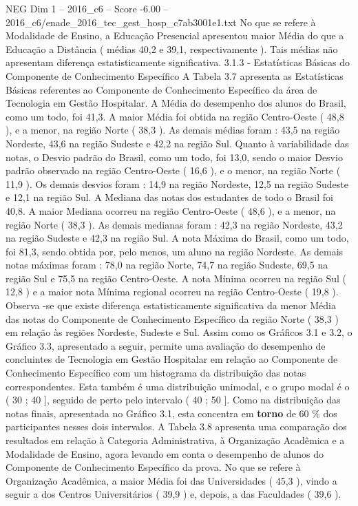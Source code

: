 \begin{textsample}{NEG Dim 1 – 2016\_c6 – Score -6.00 – 2016\_c6/enade\_2016\_tec\_gest\_hosp\_c7ab3001e1.txt}
No que se refere à Modalidade de Ensino, a Educação Presencial apresentou maior Média do que a Educação a Distância ( médias 40,2 e 39,1, respectivamente ).
Tais médias não apresentam diferença estatisticamente significativa. 3.1.3 - Estatísticas Básicas do Componente de Conhecimento Específico A Tabela 3.7 apresenta as Estatísticas Básicas referentes ao Componente de Conhecimento Específico da área de Tecnologia em Gestão Hospitalar.
A Média do desempenho dos alunos do Brasil, como um todo, foi 41,3.
A maior Média foi obtida na região Centro-Oeste ( 48,8 ), e a menor, na região Norte ( 38,3 ).
As demais médias foram : 43,5 na região Nordeste, 43,6 na região Sudeste e 42,2 na região Sul.
Quanto à variabilidade das notas, o Desvio padrão do Brasil, como um todo, foi 13,0, sendo o maior Desvio padrão observado na região Centro-Oeste ( 16,6 ), e o menor, na região Norte ( 11,9 ).
Os demais desvios foram : 14,9 na região Nordeste, 12,5 na região Sudeste e 12,1 na região Sul.
A Mediana das notas dos estudantes de todo o Brasil foi 40,8.
A maior Mediana ocorreu na região Centro-Oeste ( 48,6 ), e a menor, na região Norte ( 38,3 ).
As demais medianas foram : 42,3 na região Nordeste, 43,2 na região Sudeste e 42,3 na região Sul.
A nota Máxima do Brasil, como um todo, foi 81,3, sendo obtida por, pelo menos, um aluno na região Nordeste.
As demais notas máximas foram : 78,0 na região Norte, 74,7 na região Sudeste, 69,5 na região Sul e 75,5 na região Centro-Oeste.
A nota Mínima ocorreu na região Sul ( 12,8 ) e a maior nota Mínima regional ocorreu na região Centro-Oeste ( 19,8 ).
Observa -se que existe diferença estatisticamente significativa da menor Média das notas do Componente de Conhecimento Específico da região Norte ( 38,3 ) em relação às regiões Nordeste, Sudeste e Sul.
Assim como os Gráficos 3.1 e 3.2, o Gráfico 3.3, apresentado a seguir, permite uma avaliação do desempenho de concluintes de Tecnologia em Gestão Hospitalar em relação ao Componente de Conhecimento Específico com um histograma da distribuição das notas correspondentes.
Esta também é uma distribuição unimodal, e o grupo modal é o ( 30 ; 40 ], seguido de perto pelo intervalo ( 40 ; 50 ].
Como na distribuição das notas finais, apresentada no Gráfico 3.1, esta concentra em \textbf{torno} de 60 \% dos participantes nesses dois intervalos.
A Tabela 3.8 apresenta uma comparação dos resultados em relação à Categoria Administrativa, à Organização Acadêmica e a Modalidade de Ensino, agora levando em conta o desempenho de alunos do Componente de Conhecimento Específico da prova.
No que se refere à Organização Acadêmica, a maior Média foi das Universidades ( 45,3 ), vindo a seguir a dos Centros Universitários ( 39,9 ) e, depois, a das Faculdades ( 39,6 ).

\end{textsample}
